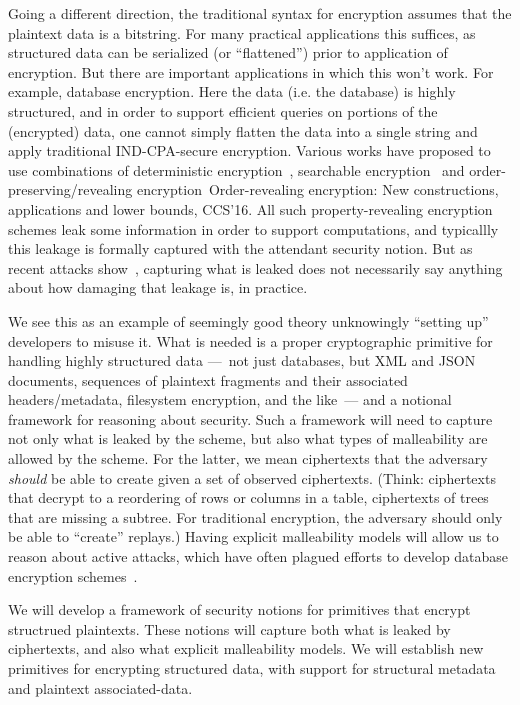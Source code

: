 Going a different direction, the traditional syntax for encryption
assumes that the plaintext data is a bitstring.  For many practical
applications this suffices, as structured data can be serialized (or
``flattened'') prior to application of encryption.  But there are
important applications in which this won't work.  For example,
database encryption.  Here the data (i.e. the database) is highly
structured, and in order to support efficient queries on portions of
the (encrypted) data, one cannot simply flatten the data into a single
string and apply traditional IND-CPA-secure encryption.  Various works
have proposed to use combinations of deterministic
encryption~\cite{xxx}, searchable
encryption~\cite{xxx} and
order-preserving/revealing encryption~\cite{xxx}{Order-revealing
  encryption: New constructions, applications and lower bounds,
  CCS'16}.  All such property-revealing encryption schemes leak some
information in order to support computations, and typicallly this
leakage is formally captured with the attendant security notion.  But
as recent attacks show~\cite{...}, capturing what is leaked
does not necessarily say anything about how damaging that leakage is,
in practice.  

We see this as an example of seemingly good theory unknowingly
``setting up'' developers to misuse it.  What is needed is a proper
cryptographic primitive for handling highly structured data ---~not
just databases, but XML and JSON documents, sequences of plaintext
fragments and their associated headers/metadata, filesystem
encryption, and the like~--- and a notional framework for reasoning
about security.  Such a framework will need to capture not only what
is leaked by the scheme, but also what types of malleability are
allowed by the scheme.  For the latter, we mean ciphertexts that the
adversary \emph{should} be able to create given a set of observed
ciphertexts.  (Think: ciphertexts that decrypt to a reordering of rows
or columns in a table, ciphertexts of trees that are missing a
subtree.  For traditional encryption, the adversary should only be
able to ``create'' replays.)  Having explicit malleability models will allow us to
reason about active attacks, which have often plagued efforts to
develop database encryption schemes~\cite{xxx}. 

\begin{task}
We will develop a framework of security notions for primitives that
encrypt structrued plaintexts.  These notions will capture both what
is leaked by ciphertexts, and also what explicit malleability models.
We will establish new primitives for encrypting structured data, with
support for structural metadata and plaintext associated-data.
\end{task}
